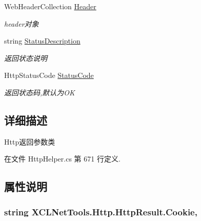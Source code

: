 \begin{DoxyCompactItemize}
Web\-Header\-Collection \hyperlink{class_x_c_l_net_tools_1_1_http_1_1_http_result_a332863b39f9b28f275a43048a91754ba}{Header}
\begin{DoxyCompactList}\small\item\em header对象 \end{DoxyCompactList}\item 
string \hyperlink{class_x_c_l_net_tools_1_1_http_1_1_http_result_a365c2a2bd1deb98cde343b1123752d9c}{Status\-Description}
\begin{DoxyCompactList}\small\item\em 返回状态说明 \end{DoxyCompactList}\item 
Http\-Status\-Code \hyperlink{class_x_c_l_net_tools_1_1_http_1_1_http_result_a2790d609062ed072dbc4a40a82d9f32c}{Status\-Code}
\begin{DoxyCompactList}\small\item\em 返回状态码,默认为\-O\-K \end{DoxyCompactList}\end{DoxyCompactItemize}


\subsection{详细描述}
Http返回参数类 



在文件 Http\-Helper.\-cs 第 671 行定义.



\subsection{属性说明}
\hypertarget{class_x_c_l_net_tools_1_1_http_1_1_http_result_a2c37e2f1cd87f1a6ebb3120752019d6a}{
\subsubsection[{Cookie}]{\setlength{\rightskip}{0pt plus 5cm}string X\-C\-L\-Net\-Tools.\-Http.\-Http\-Result.\-Cookie\hspace{0.3cm}{\ttfamily [get]}, {\ttfamily [set]}}}\label{class_x_c_l_net_tools_1_1_http_1_1_http_result_a2c37e2f1cd87f1a6ebb3120752019d6a}


